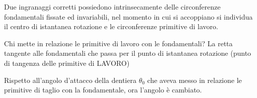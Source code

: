 \documentclass[a4paper, 15pt]{article}
\begin{document}
\begin{adjustwidth}{2in}{}
				Due ingranaggi corretti possiedono intrinsecamente delle circonferenze fondamentali fissate ed invariabili, nel momento in cui si accoppiano si individua il centro di istantanea rotazione e le circonferenze primitive di lavoro. 
				
				Chi mette in relazione le primitive di lavoro con le fondamentali? La retta tangente alle fondamentali che passa per il punto di istantanea rotazione (punto di tangenza delle primitive di LAVORO) 
				
				\begin{figure} [H]
					\centering
				\end{figure}
				\newpage
				Rispetto all'angolo d'attacco della dentiera $\theta_0$ che aveva  messo in relazione le primitive di taglio con la fondamentale, ora l'angolo è cambiato. 
				

\end{adjustwidth}
\end{document}
